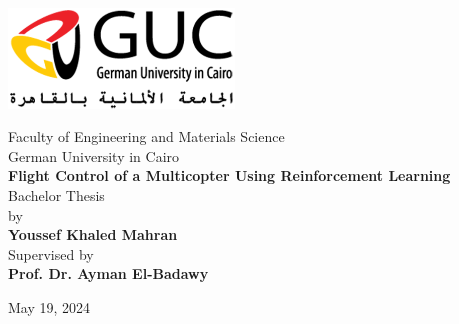 
\newpage
\thispagestyle{empty}

\vspace*{\fill}
\begin{center}
\centering
\includegraphics[width=0.45\textwidth]{Images/university.png}

    
    \vspace{0.5cm}
    \singlespacing
    Faculty of Engineering and Materials Science \\
    German University in Cairo \\
    \vspace{1cm}
    \singlespacing
    {\huge \textbf{Flight Control of a Multicopter Using Reinforcement Learning}}\\
    \singlespacing
    \vspace{1cm}
    {\large Bachelor Thesis}\\
    \vspace{1cm}
        by\\
        \vspace{0.5cm}
    {\Large \textbf{Youssef Khaled Mahran}}\\
    \singlespacing
    \vspace{1cm}
    Supervised by\\
    \vspace{0.5cm}
    {\large \textbf{Prof. Dr. Ayman El-Badawy}}\\
    
    
    \vspace{0.5cm}
    
    \singlespacing
    \vspace{1cm}
    May 19, 2024
    
\end{center}
\vspace*{\fill}
\clearpage
